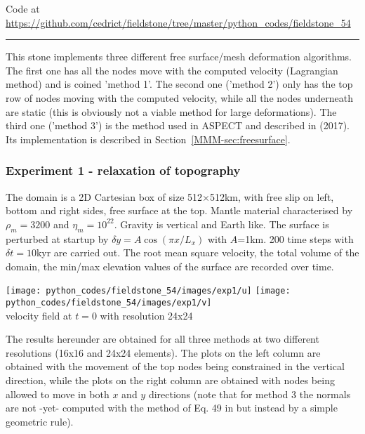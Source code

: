 

\begin{center}
Code at \url{https://github.com/cedrict/fieldstone/tree/master/python_codes/fieldstone_54}
\end{center}

\par\noindent\rule{\textwidth}{0.4pt}



This stone implements three different free surface/mesh deformation algorithms. 
The first one has all the nodes move with the computed velocity (Lagrangian method)
and is coined 'method 1'. 
The second one ('method 2') only has the top row of nodes moving with the computed velocity, 
while all the nodes underneath are static (this is obviously not a viable method for 
large deformations). 
The third one ('method 3') is the method used in ASPECT and described in \textcite{robh17} (2017).
Its implementation is described in Section~\ref{MMM-sec:freesurface}.

\subsubsection*{Experiment 1 - relaxation of topography}

The domain is a 2D Cartesian box of size 512$\times$512km, with free slip on left, 
bottom and right sides, free surface at the top. 
Mantle material characterised by $\rho_m=3200$ and $\eta_m=10^{22}$. 
Gravity is vertical and Earth like. 
The surface is perturbed at startup by $\delta y = A \cos (\pi x /L_x)$ with $A$=1km.
200 time steps with $\delta t=10$kyr are carried out.
The root mean square velocity, the total volume of the domain, the min/max elevation
values of the surface are recorded over time. 

\begin{center}
\texttt{[image: python\_codes/fieldstone\_54/images/exp1/u]}
\texttt{[image: python\_codes/fieldstone\_54/images/exp1/v]}\\
{\captionfont velocity field at $t=0$ with resolution 24x24}
\end{center}

The results hereunder are obtained for all three methods at two different resolutions (16x16 
and 24x24 elements).
The plots on the left column are obtained with the movement of the top nodes being constrained in 
the vertical direction, while the plots on the right column are obtained with nodes being 
allowed to move in both $x$ and $y$ directions (note that for method 3 the normals are not -yet-
computed with the method of Eq. 49 in \cite{robh17} but instead by a simple geometric rule).

